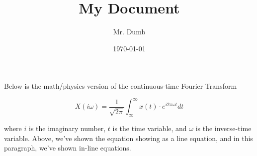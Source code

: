 \documentclass[11pt]{article}
\author{Mr. Dumb}
\date{\today}
\title{My Document}
\begin{document}
\maketitle
\tableofcontents

Below is the math/physics version of the continuous-time Fourier Transform

$$X(i\omega ) = \frac{1}{\sqrt{2\pi}} \int ^ \infty _\infty x(t) \cdot e^{i 2\pi \omega t} dt$$

where \(i\) is the imaginary number, \(t\) is the time variable, and \(\omega\) is the inverse-time variable. Above, we've shown the equation showing as a line equation, and in this paragraph, we've shown in-line equations.
\end{document}
